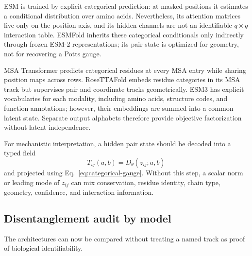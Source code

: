 \documentclass[10pt]{article}
\begin{document}
ESM is trained by explicit categorical prediction: at masked positions it estimates a conditional
distribution over amino acids.  Nevertheless, its attention matrices live only on the position
axis, and its hidden channels are not an identifiable $q\times q$ interaction table.  ESMFold
inherits these categorical conditionals only indirectly through frozen ESM-2 representations;
its pair state is optimized for geometry, not for recovering a Potts gauge.

MSA Transformer predicts categorical residues at every MSA entry while sharing position maps across
rows.  RoseTTAFold embeds residue categories in its MSA track but supervises pair and coordinate
tracks geometrically.  ESM3 has explicit vocabularies for each modality, including amino acids,
structure codes, and function annotations; however, their embeddings are summed into a common
latent state.  Separate output alphabets therefore provide objective factorization without latent
independence.

For mechanistic interpretation, a hidden pair state should be decoded into a typed field
\begin{equation}
T_{ij}(a,b)=D_{\theta}(z_{ij};a,b)
\end{equation}
and projected using Eq.~\ref{eq:categorical-gauge}.  Without this step, a scalar norm or leading
mode of $z_{ij}$ can mix conservation, residue identity, chain type, geometry, confidence, and
interaction information.

\subsection{Disentanglement audit by model}

The architectures can now be compared without treating a named track as proof of biological
identifiability.
\end{document}
